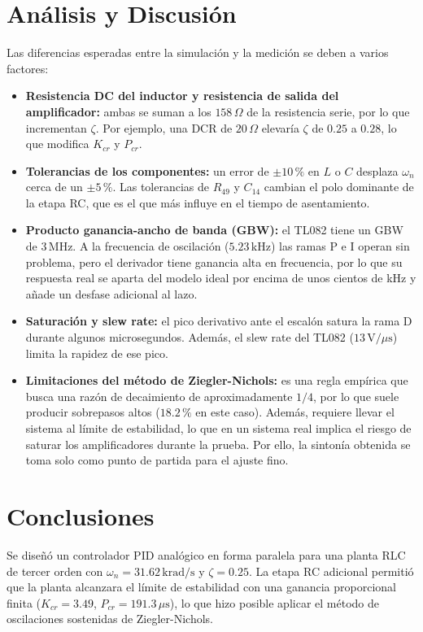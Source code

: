 \documentclass[pdflatex,sn-mathphys-num]{sn-jnl}%
\begin{document}
\section{Análisis y Discusión}

Las diferencias esperadas entre la simulación y la medición se deben a varios factores:

\begin{itemize}
    \item \textbf{Resistencia DC del inductor y resistencia de salida del amplificador:} ambas se suman a los $158\,\Omega$ de la resistencia serie, por lo que incrementan $\zeta$. Por ejemplo, una DCR de $20\,\Omega$ elevaría $\zeta$ de $0.25$ a $0.28$, lo que modifica $K_{cr}$ y $P_{cr}$.
    \item \textbf{Tolerancias de los componentes:} un error de $\pm10\,\%$ en $L$ o $C$ desplaza $\omega_n$ cerca de un $\pm5\,\%$. Las tolerancias de $R_{49}$ y $C_{14}$ cambian el polo dominante de la etapa RC, que es el que más influye en el tiempo de asentamiento.
    \item \textbf{Producto ganancia-ancho de banda (GBW):} el TL082 tiene un GBW de $3\,\text{MHz}$. A la frecuencia de oscilación ($5.23\,\text{kHz}$) las ramas P e I operan sin problema, pero el derivador tiene ganancia alta en frecuencia, por lo que su respuesta real se aparta del modelo ideal por encima de unos cientos de kHz y añade un desfase adicional al lazo.
    \item \textbf{Saturación y slew rate:} el pico derivativo ante el escalón satura la rama D durante algunos microsegundos. Además, el slew rate del TL082 ($13\,\text{V}/\mu\text{s}$) limita la rapidez de ese pico.
    \item \textbf{Limitaciones del método de Ziegler-Nichols:} es una regla empírica que busca una razón de decaimiento de aproximadamente $1/4$, por lo que suele producir sobrepasos altos ($18.2\,\%$ en este caso). Además, requiere llevar el sistema al límite de estabilidad, lo que en un sistema real implica el riesgo de saturar los amplificadores durante la prueba. Por ello, la sintonía obtenida se toma solo como punto de partida para el ajuste fino.
\end{itemize}

\section{Conclusiones}

Se diseñó un controlador PID analógico en forma paralela para una planta RLC de tercer orden con $\omega_n=31.62\,\text{krad/s}$ y $\zeta=0.25$. La etapa RC adicional permitió que la planta alcanzara el límite de estabilidad con una ganancia proporcional finita ($K_{cr}=3.49$, $P_{cr}=191.3\,\mu\text{s}$), lo que hizo posible aplicar el método de oscilaciones sostenidas de Ziegler-Nichols.
\end{document}
